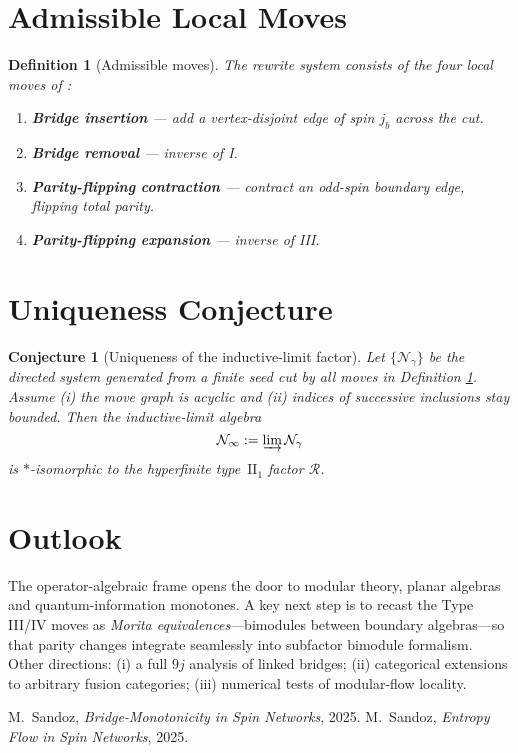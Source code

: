 \documentclass[11pt]{article}
\newtheorem{definition}{Definition}[section]
\newtheorem{conjecture}{Conjecture}[section]
\begin{document}
\section{Admissible Local Moves}

\begin{definition}[Admissible moves]\label{def:moves}
The rewrite system consists of the four local moves of \cite{EntropyMono}:
\begin{enumerate}
\item[\textbf{I.}] \textbf{Bridge insertion} — add a vertex-disjoint edge of spin
      $j_b$ across the cut.
\item[\textbf{II.}] \textbf{Bridge removal} — inverse of I.
\item[\textbf{III.}] \textbf{Parity-flipping contraction} — contract an odd-spin
      boundary edge, flipping total parity.
\item[\textbf{IV.}] \textbf{Parity-flipping expansion} — inverse of III.
\end{enumerate}
\end{definition}

\section{Uniqueness Conjecture}

\begin{conjecture}[Uniqueness of the inductive-limit factor]\label{conj:unique}
Let $\{\mathcal N_{\gamma}\}$ be the directed system generated from a finite seed
cut by all moves in Definition \ref{def:moves}.  Assume (i) the move graph is
acyclic and (ii) indices of successive inclusions stay bounded.  Then the
inductive-limit algebra
\[
  \mathcal N_{\infty}:=\varinjlim\mathcal N_{\gamma}
\]
is $*$-isomorphic to the hyperfinite type~$\mathrm{II}_1$ factor $\mathcal R$.
\end{conjecture}

\section{Outlook}
The operator-algebraic frame opens the door to modular theory, planar
algebras and quantum-information monotones.  A key next step is to recast the
Type III/IV moves as \emph{Morita equivalences}—bimodules between boundary
algebras—so that parity changes integrate seamlessly into subfactor bimodule
formalism.  Other directions: (i) a full $9j$ analysis of linked bridges; (ii)
categorical extensions to arbitrary fusion categories; (iii) numerical tests of
modular-flow locality.


\begin{thebibliography}{9}
 M.~Sandoz, \emph{Bridge-Monotonicity in Spin Networks}, 2025.
 M.~Sandoz, \emph{Entropy Flow in Spin Networks}, 2025.
\end{thebibliography}
\end{document}
